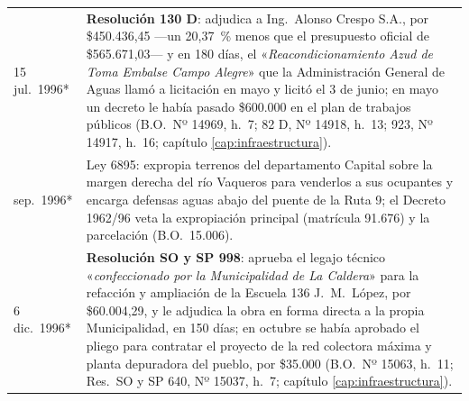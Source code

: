 \begin{longtable}{@{}p{2.7cm}p{10.3cm}@{}}
15 jul.\ 1996* & \textbf{Resolución 130 D}: adjudica a Ing.\ Alonso Crespo S.A., por \$450.436,45 ---un 20,37~\% menos que el presupuesto oficial de \$565.671,03--- y en 180 días, el «\textit{Reacondicionamiento Azud de Toma Embalse Campo Alegre}» que la Administración General de Aguas llamó a licitación en mayo y licitó el 3 de junio; en mayo un decreto le había pasado \$600.000 en el plan de trabajos públicos (B.O.\ Nº 14969, h.\ 7; 82 D, Nº 14918, h.\ 13; 923, Nº 14917, h.\ 16; capítulo \ref{cap:infraestructura}). \\
sep.\ 1996* & Ley 6895: expropia terrenos del departamento Capital sobre la margen derecha del río Vaqueros para venderlos a sus ocupantes y encarga defensas aguas abajo del puente de la Ruta 9; el Decreto 1962/96 veta la expropiación principal (matrícula 91.676) y la parcelación (B.O.\ 15.006). \\
6 dic.\ 1996* & \textbf{Resolución SO y SP 998}: aprueba el legajo técnico «\textit{confeccionado por la Municipalidad de La Caldera}» para la refacción y ampliación de la Escuela 136 J.\ M.\ López, por \$60.004,29, y le adjudica la obra en forma directa a la propia Municipalidad, en 150 días; en octubre se había aprobado el pliego para contratar el proyecto de la red colectora máxima y planta depuradora del pueblo, por \$35.000 (B.O.\ Nº 15063, h.\ 11; Res.\ SO y SP 640, Nº 15037, h.\ 7; capítulo \ref{cap:infraestructura}). \\

\end{longtable}
